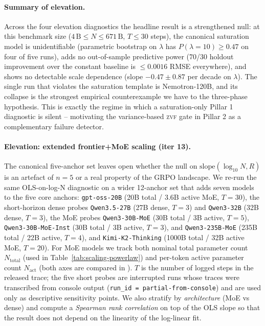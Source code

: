 \paragraph{Summary of elevation.}
\label{par:scaling-summary}
Across the four elevation diagnostics the headline result is a
strengthened null: at this benchmark size
($4\,\text{B} \le N \le 671\,\text{B}$, $T \le 30$ steps), the
canonical saturation model is unidentifiable (parametric bootstrap
on $\lambda$ has $P(\lambda = 10) \ge 0.47$ on four of five runs),
adds no out-of-sample predictive power (70/30 holdout improvement
over the constant baseline is $\le 0.0016$ RMSE everywhere), and
shows no detectable scale dependence (slope $-0.47 \pm 0.87$ per
decade on $\lambda$).  The single run that violates the saturation
template is Nemotron-120B, and its collapse is the strongest
empirical counterexample we have to the three-phase hypothesis.
This is exactly the regime in which a saturation-only Pillar 1
diagnostic is silent -- motivating the variance-based
\textsc{zvf} gate in Pillar 2 as a complementary failure detector.

\paragraph{Elevation: extended frontier+MoE scaling (iter 13).}
\label{par:scaling-extended}
The canonical five-anchor set leaves open whether the null on
$\text{slope}(\log_{10}N, R)$ is an artefact of $n = 5$ or a real
property of the GRPO landscape.  We re-run the same OLS-on-log-N
diagnostic on a wider 12-anchor set that adds seven models to the five
core anchors: \citet{gptoss} \texttt{gpt-oss-20B} (20B total / 3.6B
active MoE, $T=30$), the short-horizon dense probes
\texttt{Qwen3.5-27B} (27B dense, $T=3$) and \texttt{Qwen3-32B} (32B
dense, $T=3$), the \citet{qwen3moe} MoE probes \texttt{Qwen3-30B-MoE}
(30B total / 3B active, $T=5$), \texttt{Qwen3-30B-MoE-Inst} (30B
total / 3B active, $T=3$), and \texttt{Qwen3-235B-MoE} (235B total /
22B active, $T=4$), and \citet{kimi2025k2, kimi2025thinking}
\texttt{Kimi-K2-Thinking} (1000B total / 32B active MoE, $T=20$).  For
MoE models we track both nominal total parameter count $N_{\text{total}}$
(used in Table~\ref{tab:scaling-powerlaw}) and per-token active
parameter count $N_{\text{act}}$ (both axes are compared in
).  $T$ is the number of logged steps in the
released trace; the five short probes are interrupted runs whose
traces were transcribed from console output
(\texttt{run\_id = partial-from-console}) and are used only as
descriptive sensitivity points.
We also stratify by \emph{architecture} (MoE vs dense) and compute a
\emph{Spearman rank correlation} on top of the OLS slope so that
the result does not depend on the linearity of the log-linear fit.

